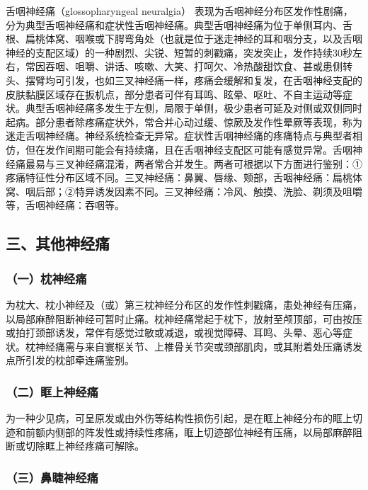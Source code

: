 舌咽神经痛（glossopharyngeal neuralgia）
表现为舌咽神经分布区发作性剧痛，分为典型舌咽神经痛和症状性舌咽神经痛。典型舌咽神经痛为位于单侧耳内、舌根、扁桃体窝、咽喉或下腭弯角处（也就是位于迷走神经的耳和咽分支，以及舌咽神经的支配区域）的一种剧烈、尖锐、短暂的刺戳痛，突发突止，发作持续30秒左右，常因吞咽、咀嚼、讲话、咳嗽、大笑、打呵欠、冷热酸甜饮食、甚或患侧转头、摆臂均可引发，也如三叉神经痛一样，疼痛会缓解和复发，在舌咽神经支配的皮肤黏膜区域存在扳机点，部分患者可伴有耳鸣、眩晕、呕吐、不自主运动等症状。典型舌咽神经痛多发生于左侧，局限于单侧，极少患者可延及对侧或双侧同时起病。部分患者除疼痛症状外，常合并心动过缓、惊厥及发作性晕厥等表现，称为迷走舌咽神经痛。神经系统检查无异常。症状性舌咽神经痛的疼痛特点与典型者相仿，但在发作间期可能会有持续痛，且在舌咽神经支配区可能有感觉异常。舌咽神经痛最易与三叉神经痛混淆，两者常合并发生。两者可根据以下方面进行鉴别：①疼痛特征性分布区域不同。三叉神经痛：鼻翼、唇缘、颊部，舌咽神经痛：扁桃体窝、咽后部；②特异诱发因素不同。三叉神经痛：冷风、触摸、洗脸、剃须及咀嚼等，舌咽神经痛：吞咽等。

\protect\hypertarget{text00355.html}{}{}

\subsection{三、其他神经痛}

\subsubsection{（一）枕神经痛}

为枕大、枕小神经及（或）第三枕神经分布区的发作性刺戳痛，患处神经有压痛，以局部麻醉阻断神经可暂时止痛。枕神经痛常起于枕下，放射至颅顶部，可由按压或拍打颈部诱发，常伴有感觉过敏或减退，或视觉障碍、耳鸣、头晕、恶心等症状。枕神经痛需与来自寰枢关节、上椎骨关节突或颈部肌肉，或其附着处压痛诱发点所引发的枕部牵连痛鉴别。

\subsubsection{（二）眶上神经痛}

为一种少见病，可呈原发或由外伤等结构性损伤引起，是在眶上神经分布的眶上切迹和前额内侧部的阵发性或持续性疼痛，眶上切迹部位神经有压痛，以局部麻醉阻断或切除眶上神经疼痛可解除。

\subsubsection{（三）鼻睫神经痛}

